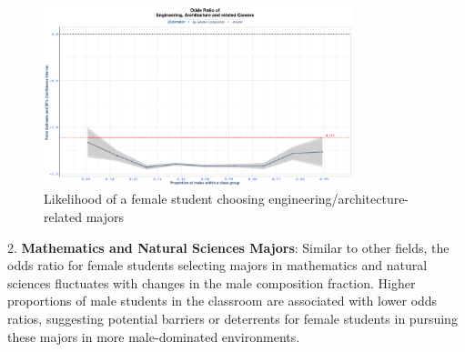 \begin{figure}[H]
\centering
\includegraphics[width=0.8\textwidth]{Graph/Results/fe_panel_student_gender_composition_wome_in_ENG_ARCH_RELATED_bce.png}
\caption{Likelihood of a female student choosing engineering/architecture-related majors}
\label{fig:eng_arch_related}
\end{figure}


2. \textbf{Mathematics and Natural Sciences Majors}: Similar to other fields, the odds ratio for female students selecting majors in mathematics and natural sciences fluctuates with changes in the male composition fraction. Higher proportions of male students in the classroom are associated with lower odds ratios, suggesting potential barriers or deterrents for female students in pursuing these majors in more male-dominated environments.

